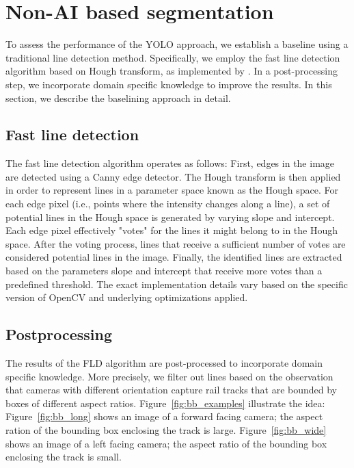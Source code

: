 \documentclass[Master,MDS,english]{BASE/twbook} %
\begin{document}
\section{Non-AI based segmentation}

To assess the performance of the YOLO approach, we establish a baseline using a traditional line detection method. Specifically, we employ the fast line detection algorithm based on Hough transform, as implemented by \cite{FLD}. In a post-processing step, we incorporate domain specific knowledge to improve the results.
In this section, we describe the baselining approach in detail.
 
 \subsection{Fast line detection}
 
The fast line detection algorithm operates as follows: First, edges in the image are detected using a Canny edge detector. The Hough transform is then applied in order to represent lines in a parameter space known as the Hough space. For each edge pixel (i.e., points where the intensity changes along a line), a set of potential lines in the Hough space is generated by varying slope and intercept. Each edge pixel effectively "votes" for the lines it might belong to in the Hough space. After the voting process, lines that receive a sufficient number of votes are considered potential lines in the image. Finally, the identified lines are extracted based on the parameters slope and intercept that receive more votes than a predefined threshold.
The exact implementation details vary based on the specific version of OpenCV and underlying optimizations applied.

\subsection{Postprocessing}

The results of the FLD algorithm are post-processed to incorporate domain specific knowledge. More precisely, we filter out lines based on the observation that cameras with different orientation capture rail tracks that are bounded by boxes of different aspect ratios. Figure~\ref{fig:bb_examples} illustrate the idea: Figure~\ref{fig:bb_long} shows an image of a forward facing camera; the aspect ration of the bounding box enclosing the track is large.  Figure~\ref{fig:bb_wide} shows an image of a left facing camera; the aspect ratio of the bounding box enclosing the track is small.
\end{document}
